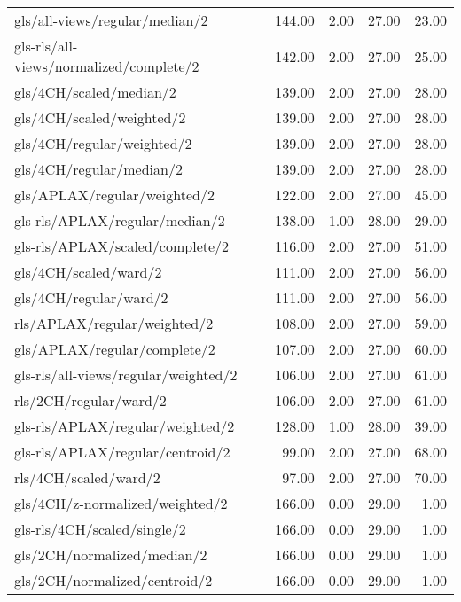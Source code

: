 \begin{longtable}{lrrrr}
    gls/all-views/regular/median/2            & 144.00 &  2.00 & 27.00 & 23.00 \\
    gls-rls/all-views/normalized/complete/2   & 142.00 &  2.00 & 27.00 & 25.00 \\
    gls/4CH/scaled/median/2                   & 139.00 &  2.00 & 27.00 & 28.00 \\
    gls/4CH/scaled/weighted/2                 & 139.00 &  2.00 & 27.00 & 28.00 \\
    gls/4CH/regular/weighted/2                & 139.00 &  2.00 & 27.00 & 28.00 \\
    gls/4CH/regular/median/2                  & 139.00 &  2.00 & 27.00 & 28.00 \\
    gls/APLAX/regular/weighted/2              & 122.00 &  2.00 & 27.00 & 45.00 \\
    gls-rls/APLAX/regular/median/2            & 138.00 &  1.00 & 28.00 & 29.00 \\
    gls-rls/APLAX/scaled/complete/2           & 116.00 &  2.00 & 27.00 & 51.00 \\
    gls/4CH/scaled/ward/2                     & 111.00 &  2.00 & 27.00 & 56.00 \\
    gls/4CH/regular/ward/2                    & 111.00 &  2.00 & 27.00 & 56.00 \\
    rls/APLAX/regular/weighted/2              & 108.00 &  2.00 & 27.00 & 59.00 \\
    gls/APLAX/regular/complete/2              & 107.00 &  2.00 & 27.00 & 60.00 \\
    gls-rls/all-views/regular/weighted/2      & 106.00 &  2.00 & 27.00 & 61.00 \\
    rls/2CH/regular/ward/2                    & 106.00 &  2.00 & 27.00 & 61.00 \\
    gls-rls/APLAX/regular/weighted/2          & 128.00 &  1.00 & 28.00 & 39.00 \\
    gls-rls/APLAX/regular/centroid/2          &  99.00 &  2.00 & 27.00 & 68.00 \\
    rls/4CH/scaled/ward/2                     &  97.00 &  2.00 & 27.00 & 70.00 \\
    gls/4CH/z-normalized/weighted/2           & 166.00 &  0.00 & 29.00 &  1.00 \\
    gls-rls/4CH/scaled/single/2               & 166.00 &  0.00 & 29.00 &  1.00 \\
    gls/2CH/normalized/median/2               & 166.00 &  0.00 & 29.00 &  1.00 \\
    gls/2CH/normalized/centroid/2             & 166.00 &  0.00 & 29.00 &  1.00 \\

\end{longtable}

